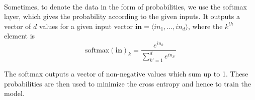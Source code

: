\documentclass{article}
\begin{document}
      \paragraph{} Sometimes, to denote the data in the form of probabilities, we use the softmax layer, which gives the probability according to the given inputs. It outputs a vector of $d$ values for a given input vector $\mathbf{in} = \langle in_1, \dots, in_d \rangle$, where the $k^{th}$ element is
      \begin{equation*}
        \text{softmax}(\mathbf{in})_k = \frac{e^{in_k}}{\sum_{k' = 1}^{d} e^{in_{k'}}}
      \end{equation*}

      The softmax outputs a vector of non-negative values which sum up to 1. These probabilities are then used to minimize the cross entropy and hence to train the model.
\end{document}
